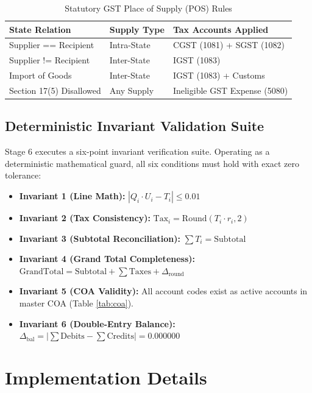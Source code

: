 \documentclass[conference]{IEEEtran}
\begin{document}
\begin{table}[htbp]
\caption{Statutory GST Place of Supply (POS) Rules}
\begin{center}
\begin{tabularx}{\columnwidth}{llX}
\toprule
\textbf{State Relation} & \textbf{Supply Type} & \textbf{Tax Accounts Applied} \\
\midrule
Supplier == Recipient & Intra-State & CGST (1081) + SGST (1082) \\
Supplier != Recipient & Inter-State & IGST (1083) \\
Import of Goods & Inter-State & IGST (1083) + Customs \\
Section 17(5) Disallowed & Any Supply & Ineligible GST Expense (5080) \\
\bottomrule
\end{tabularx}
\label{tab:gst}
\end{center}
\end{table}

\subsection{Deterministic Invariant Validation Suite}
Stage 6 executes a six-point invariant verification suite. Operating as a deterministic mathematical guard, all six conditions must hold with exact zero tolerance:
\begin{itemize}
    \item \textbf{Invariant 1 (Line Math):} $| Q_i \cdot U_i - T_i | \le 0.01$
    \item \textbf{Invariant 2 (Tax Consistency):} $\text{Tax}_i = \text{Round}(T_i \cdot r_i, 2)$
    \item \textbf{Invariant 3 (Subtotal Reconciliation):} $\sum T_i = \text{Subtotal}$
    \item \textbf{Invariant 4 (Grand Total Completeness):} $\text{GrandTotal} = \text{Subtotal} + \sum \text{Taxes} + \Delta_{\text{round}}$
    \item \textbf{Invariant 5 (COA Validity):} All account codes exist as active accounts in master COA (Table \ref{tab:coa}).
    \item \textbf{Invariant 6 (Double-Entry Balance):} $\Delta_{\text{bal}} = | \sum \text{Debits} - \sum \text{Credits} | = 0.000000$
\end{itemize}

\section{Implementation Details}
\end{document}
